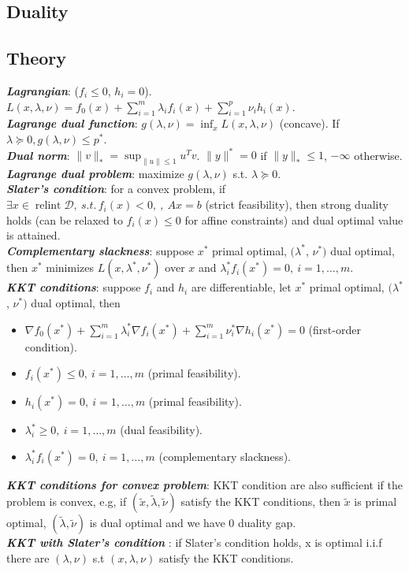 \documentclass[a4paper, 11pt, twocolumn, landscape]{article}
\theoremstyle{lemma-style}
\theoremstyle{thm-style}
\theoremstyle{prop-style}
\theoremstyle{cor-style}
\DeclareMathOperator{\relint}{relint}
\renewcommand{\emph}[1]{\textbf{\textit{#1}}}
\begin{document}
\begin{small}
\section{Duality}
    \subsection{Theory}

\emph{Lagrangian}: ($f_i \leq 0$, $h_i = 0$). $L(x, \lambda, \nu) = f_0(x) + \sum_{i=1}^{m} \lambda_i f_i(x) + \sum_{i=1}^{p} \nu_i h_i(x)$. \\
\emph{Lagrange dual function}: $g(\lambda, \nu) = \inf_{x} L(x, \lambda, \nu)$ (concave). If $\lambda \succeq 0, g(\lambda, \nu) \leq p^*$. \\
\emph{Dual norm}: $\|v\|_* = \sup_{\|u\| \leq 1} u^Tv$. $\|y\|^* = 0$ if $\|y\|_* \leq 1$, $-\infty$ otherwise. \\
\emph{Lagrange dual problem}: maximize $g(\lambda, \nu)$ s.t. $\lambda \succeq 0$. \\
\emph{Slater's condition}: for a convex problem, if $\exists x \in \relint{\mathcal{D}},\ s.t.\, f_i(x) < 0,\ ,\ A x = b$ (strict feasibility), then strong duality holds (can be relaxed to $f_i(x) \le 0$ for affine constraints) and dual optimal value is attained. \\
\emph{Complementary slackness}: suppose $x^*$ primal optimal, $(\lambda^*$, $\nu^*)$ dual optimal, then $x^*$ minimizes $L(x, \lambda^*, \nu^*)$ over $x$ and $\lambda_i^* f_i(x^*) = 0,\ i = 1,\dots, m$. \\
\emph{KKT conditions}: suppose $f_i$ and $h_i$ are differentiable, let $x^*$ primal optimal, $(\lambda^*$, $\nu^*)$ dual optimal, then \begin{itemize}
\item $\nabla f_0 (x^*) + \sum_{i = 1}^m \lambda_i^* \nabla f_i(x^*) + \sum_{i = 1}^m \nu_i^* \nabla h_i(x^*) = 0$ (first-order condition).
\item $f_i(x^*) \le 0,\ i = 1, \dots, m$ (primal feasibility).
\item $h_i(x^*) = 0,\ i = 1, \dots, m$ (primal feasibility).
\item $\lambda_i^* \geq 0,\ i = 1, \dots, m$ (dual feasibility).
\item $\lambda_i^* f_i(x^*) = 0,\ i = 1, \dots, m$ (complementary slackness).
\end{itemize}

\noindent \emph{KKT conditions for convex problem}: KKT condition are also sufficient if the problem is convex, e.g, if $(\tilde{x}, \tilde{\lambda}, \tilde{\nu})$ satisfy the KKT conditions, then $\tilde{x}$ is primal optimal, $(\tilde{\lambda}, \tilde{\nu})$ is dual optimal and we have $0$
duality gap. \\
\emph{KKT with Slater's condition} : if Slater's condition holds, x is optimal i.i.f there are $(\lambda, \nu)$ s.t $(x, \lambda, \nu)$ satisfy the KKT conditions.


\end{small}
\end{document}
